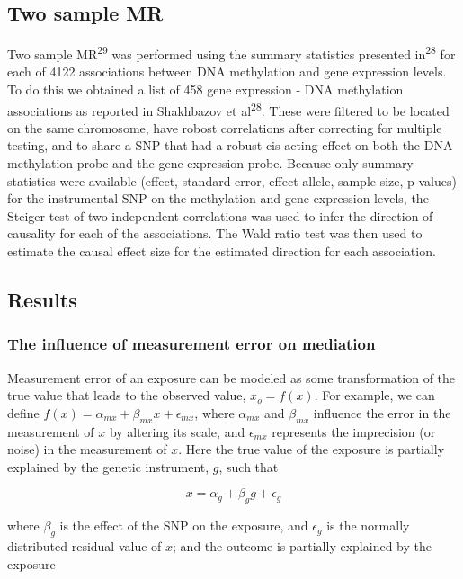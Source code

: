 \documentclass[]{article}
\begin{document}
\subsection{Two sample MR}\label{two-sample-mr}

Two sample MR\textsuperscript{29} was performed using the summary
statistics presented in\textsuperscript{28} for each of 4122
associations between DNA methylation and gene expression levels. To do
this we obtained a list of 458 gene expression - DNA methylation
associations as reported in Shakhbazov et al\textsuperscript{28}. These
were filtered to be located on the same chromosome, have robost
correlations after correcting for multiple testing, and to share a SNP
that had a robust cis-acting effect on both the DNA methylation probe
and the gene expression probe. Because only summary statistics were
available (effect, standard error, effect allele, sample size, p-values)
for the instrumental SNP on the methylation and gene expression levels,
the Steiger test of two independent correlations was used to infer the
direction of causality for each of the associations. The Wald ratio test
was then used to estimate the causal effect size for the estimated
direction for each association.

\subsection{Results}\label{results}

\subsubsection{The influence of measurement error on
mediation}\label{the-influence-of-measurement-error-on-mediation}

Measurement error of an exposure can be modeled as some transformation
of the true value that leads to the observed value, \(x_o = f(x)\). For
example, we can define
\(f(x) = \alpha_{mx} + \beta_{mx} x + \epsilon_{mx}\), where
\(\alpha_{mx}\) and \(\beta_{mx}\) influence the error in the
measurement of \(x\) by altering its scale, and \(\epsilon_{mx}\)
represents the imprecision (or noise) in the measurement of \(x\). Here
the true value of the exposure is partially explained by the genetic
instrument, \(g\), such that

\[
x = \alpha_g + \beta_g g + \epsilon_g
\]

where \(\beta_g\) is the effect of the SNP on the exposure, and
\(\epsilon_g\) is the normally distributed residual value of \(x\); and
the outcome is partially explained by the exposure
\end{document}
